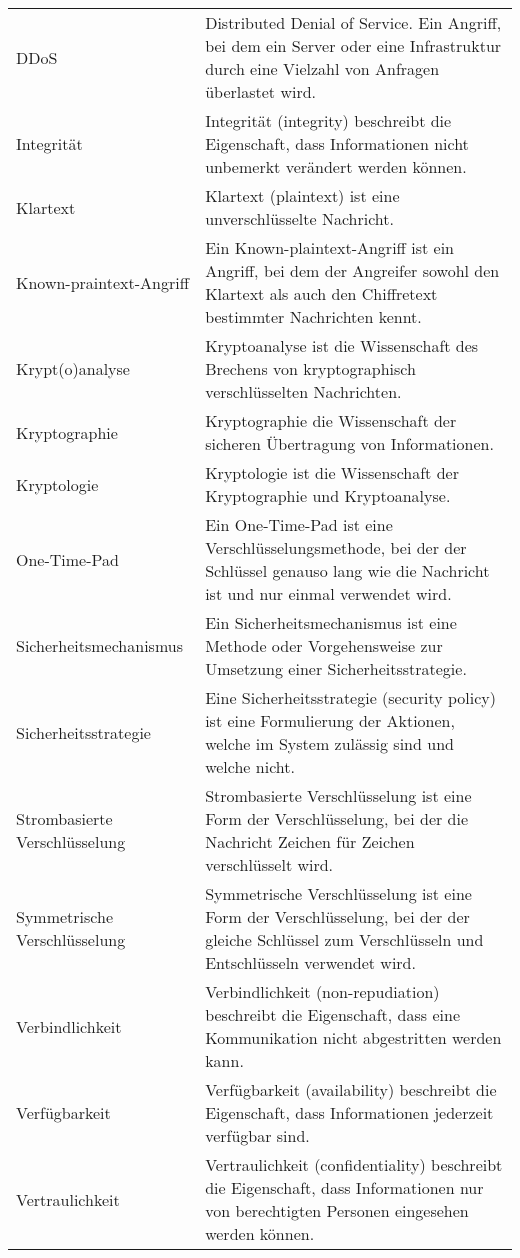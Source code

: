 \documentclass{scrartcl}
\begin{document}
\begin{xltabular}{\textwidth}{lX}
    DDoS & Distributed Denial of Service. Ein Angriff, bei dem ein Server oder eine Infrastruktur durch eine Vielzahl von Anfragen überlastet wird. \\
    Integrität & Integrität (integrity) beschreibt die Eigenschaft, dass Informationen nicht unbemerkt verändert werden können. \\
    Klartext & Klartext (plaintext) ist eine unverschlüsselte Nachricht. \\
    Known-praintext-Angriff & Ein Known-plaintext-Angriff ist ein Angriff, bei dem der Angreifer sowohl den Klartext als auch den Chiffretext bestimmter Nachrichten kennt. \\
    Krypt(o)analyse & Kryptoanalyse ist die Wissenschaft des Brechens von kryptographisch verschlüsselten Nachrichten. \\
    Kryptographie & Kryptographie die Wissenschaft der sicheren Übertragung von Informationen. \\
    Kryptologie & Kryptologie ist die Wissenschaft der Kryptographie und Kryptoanalyse. \\
    One-Time-Pad & Ein One-Time-Pad ist eine Verschlüsselungsmethode, bei der der Schlüssel genauso lang wie die Nachricht ist und nur einmal verwendet wird. \\
    Sicherheitsmechanismus & Ein Sicherheitsmechanismus ist eine Methode oder Vorgehensweise zur Umsetzung einer Sicherheitsstrategie. \\
    Sicherheitsstrategie & Eine Sicherheitsstrategie (security policy) ist eine Formulierung der Aktionen, welche im System zulässig sind und welche nicht. \\
    Strombasierte Verschlüsselung & Strombasierte Verschlüsselung ist eine Form der Verschlüsselung, bei der die Nachricht Zeichen für Zeichen verschlüsselt wird. \\
    Symmetrische Verschlüsselung & Symmetrische Verschlüsselung ist eine Form der Verschlüsselung, bei der der gleiche Schlüssel zum Verschlüsseln und Entschlüsseln verwendet wird. \\
    Verbindlichkeit & Verbindlichkeit (non-repudiation) beschreibt die Eigenschaft, dass eine Kommunikation nicht abgestritten werden kann. \\
    Verfügbarkeit & Verfügbarkeit (availability) beschreibt die Eigenschaft, dass Informationen jederzeit verfügbar sind. \\
    Vertraulichkeit & Vertraulichkeit (confidentiality) beschreibt die Eigenschaft, dass Informationen nur von berechtigten Personen eingesehen werden können. \\
\end{xltabular}
\end{document}
